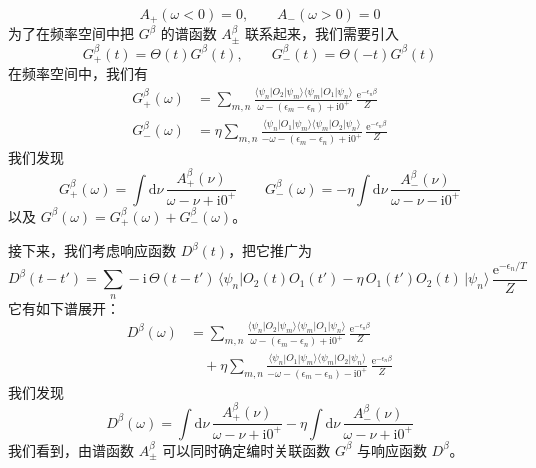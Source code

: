 \begin{equation*}
A_{+}(\omega < 0) = 0, \qquad A_{-}(\omega > 0) = 0
\end{equation*}
为了在频率空间中把 $G^{\beta}$ 的谱函数 $A^{\beta}_{\pm}$ 联系起来，我们需要引入
\begin{equation*}
G^{\beta}_{+}(t) = \Theta(t)G^{\beta}(t), \qquad G^{\beta}_{-}(t) = \Theta(-t)G^{\beta}(t)
\end{equation*}
在频率空间中，我们有
\begin{align*}
G^{\beta}_{+}(\omega) &= \sum_{m,n} \frac{\langle\psi_n|O_2|\psi_m\rangle\langle\psi_m|O_1|\psi_n\rangle}{\omega - (\epsilon_m - \epsilon_n) + \mathrm{i}0^{+}}\, \frac{\mathrm{e}^{-\epsilon_n\beta}}{Z}
\\
G^{\beta}_{-}(\omega) &= \eta \sum_{m,n} \frac{\langle\psi_n|O_1|\psi_m\rangle\langle\psi_m|O_2|\psi_n\rangle}{-\omega - (\epsilon_m - \epsilon_n) + \mathrm{i}0^{+}}\, \frac{\mathrm{e}^{-\epsilon_n\beta}}{Z}
\end{align*}
我们发现
\begin{equation*}
\boxed{\; G^{\beta}_{+}(\omega) = \int \mathrm{d}\nu\, \frac{A^{\beta}_{+}(\nu)}{\omega - \nu + \mathrm{i}0^{+}} \qquad G^{\beta}_{-}(\omega) = -\eta \int \mathrm{d}\nu\, \frac{A^{\beta}_{-}(\nu)}{\omega - \nu - \mathrm{i}0^{+}} \;} \tag{2.2.29}
\end{equation*}
以及 $G^{\beta}(\omega) = G^{\beta}_{+}(\omega) + G^{\beta}_{-}(\omega)$。

接下来，我们考虑响应函数 $D^{\beta}(t)$，把它推广为
\begin{equation*}
D^{\beta}(t-t') = \sum_n -\mathrm{i}\,\Theta(t-t')\,\langle\psi_n|O_2(t)O_1(t') - \eta\, O_1(t')O_2(t)\,|\psi_n\rangle\, \frac{\mathrm{e}^{-\epsilon_n/T}}{Z} \tag{2.2.30}
\end{equation*}
它有如下谱展开：
\begin{align*}
D^{\beta}(\omega) &= \sum_{m,n} \frac{\langle\psi_n|O_2|\psi_m\rangle\langle\psi_m|O_1|\psi_n\rangle}{\omega - (\epsilon_m - \epsilon_n) + \mathrm{i}0^{+}}\, \frac{\mathrm{e}^{-\epsilon_n\beta}}{Z}
\\
&\quad + \eta \sum_{m,n} \frac{\langle\psi_n|O_1|\psi_m\rangle\langle\psi_m|O_2|\psi_n\rangle}{-\omega - (\epsilon_m - \epsilon_n) - \mathrm{i}0^{+}}\, \frac{\mathrm{e}^{-\epsilon_n\beta}}{Z} \tag{2.2.31}
\end{align*}
我们发现
\begin{equation*}
\boxed{\; D^{\beta}(\omega) = \int \mathrm{d}\nu\, \frac{A^{\beta}_{+}(\nu)}{\omega - \nu + \mathrm{i}0^{+}} - \eta \int \mathrm{d}\nu\, \frac{A^{\beta}_{-}(\nu)}{\omega - \nu + \mathrm{i}0^{+}} \;} \tag{2.2.32}
\end{equation*}
我们看到，由谱函数 $A^{\beta}_{\pm}$ 可以同时确定编时关联函数 $G^{\beta}$ 与响应函数 $D^{\beta}$。

